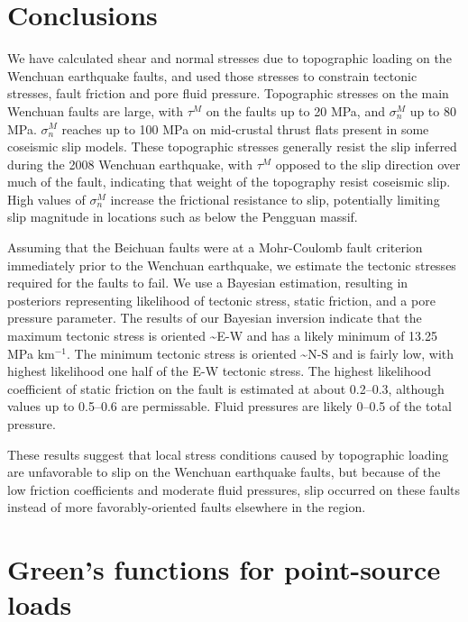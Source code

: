 \documentclass[twocolumn,jgrga]{AGUTeX}
\begin{document}
\begin{article}
{{\section{Conclusions}\label{conclusions}

We have calculated shear and normal stresses due to topographic loading
on the Wenchuan earthquake faults, and used those stresses to constrain
tectonic stresses, fault friction and pore fluid pressure. Topographic
stresses on the main Wenchuan faults are large, with $\tau^M$ on the
faults up to \textbar{}20\textbar{} MPa, and $\sigma^M_n$ up to 80 MPa.
$\sigma^M_n$ reaches up to 100 MPa on mid-crustal thrust flats present
in some coseismic slip models. These topographic stresses generally
resist the slip inferred during the 2008 Wenchuan earthquake, with
$\tau^M$ opposed to the slip direction over much of the fault,
indicating that weight of the topography resist coseismic slip. High
values of $\sigma^M_n$ increase the frictional resistance to slip,
potentially limiting slip magnitude in locations such as below the
Pengguan massif.

Assuming that the Beichuan faults were at a Mohr-Coulomb fault criterion
immediately prior to the Wenchuan earthquake, we estimate the tectonic
stresses required for the faults to fail. We use a Bayesian estimation,
resulting in posteriors representing likelihood of tectonic stress,
static friction, and a pore pressure parameter. The results of our
Bayesian inversion indicate that the maximum tectonic stress is oriented
\textasciitilde{}E-W and has a likely minimum of 13.25 MPa km$^{-1}$.
The minimum tectonic stress is oriented \textasciitilde{}N-S and is
fairly low, with highest likelihood one half of the E-W tectonic stress.
The highest likelihood coefficient of static friction on the fault is
estimated at about 0.2--0.3, although values up to 0.5--0.6 are
permissable. Fluid pressures are likely 0--0.5 of the total pressure.

These results suggest that local stress conditions caused by topographic
loading are unfavorable to slip on the Wenchuan earthquake faults, but
because of the low friction coefficients and moderate fluid pressures,
slip occurred on these faults instead of more favorably-oriented faults
elsewhere in the region.

\appendix

\section{Green's functions for point-source
loads}\label{greens-functions-for-point-source-loads}

}}
\end{article}
\end{document}
